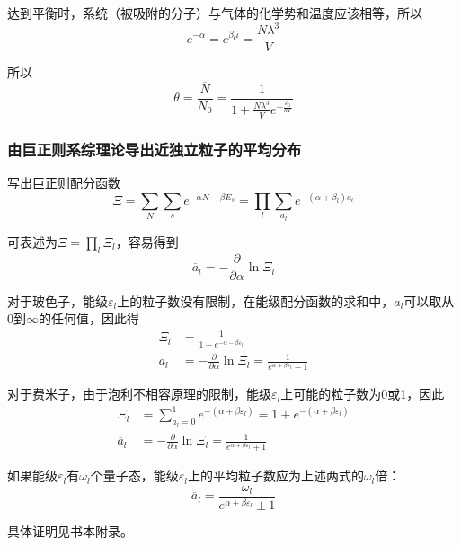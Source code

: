 \documentclass[UTF8]{ctexart}
\begin{document}
	达到平衡时，系统（被吸附的分子）与气体的化学势和温度应该相等，所以
	\begin{equation}
		e^{-\alpha}=e^{\beta \mu}=\frac{N \lambda^{3}}{V}
	\end{equation}
	
\noindent 所以
\begin{equation}
	\theta= \frac{\overline{N}}{N_{0}}=\frac{1}{1+\frac{N \lambda^{3}}{V} e^{-\frac{\varepsilon_{0}}{k T}}}
\end{equation}

	\subsubsection{由巨正则系综理论导出近独立粒子的平均分布}
	写出巨正则配分函数
	\begin{equation}
		\Xi =\sum_{N} \sum_{s} e^{-\alpha N-\beta E_{s}}=\prod_{l} \sum_{a_{l}} e^{-\left(\alpha+\beta_{l}\right) a_{l}}
	\end{equation}
	
\noindent 可表述为$ \Xi =\prod_{l} \Xi_{l} $，容易得到
	\begin{equation}
		\overline{a}_{l} = -\frac{\partial}{\partial \alpha} \ln \Xi_{l}
	\end{equation}
	
	对于玻色子，能级$ \varepsilon_{l} $上的粒子数没有限制，在能级配分函数的求和中，$ a_{l} $可以取从0到$ \infty $的任何值，因此得
	\begin{equation}
	\begin{aligned}
	\Xi_{l} &=\frac{1}{1-e^{-\alpha-\beta \varepsilon_{l}}}\\
	\overline{a}_{l}&=-\frac{\partial}{\partial \alpha} \ln \Xi_{l}=\frac{1}{e^{\alpha+\beta \varepsilon_{l}}-1}
	\end{aligned}
	\end{equation}
	
	对于费米子，由于泡利不相容原理的限制，能级$ \varepsilon_{l} $上可能的粒子数为0或1，因此
	\begin{equation}
		\begin{aligned}
		\Xi_{l} &=\sum_{a_{l}=0}^{1} e^{-\left(\alpha+\beta \varepsilon_{l}\right)}=1+e^{-\left(\alpha+\beta \varepsilon_{l}\right)}
		\\
		\overline{a}_{l}&=-\frac{\partial}{\partial \alpha} \ln \Xi_{l} =\frac{1}{e^{\alpha+\beta \varepsilon_{l}}+1}
		\end{aligned}
	\end{equation}
	
	如果能级$ \varepsilon_{l} $有$ \omega_{l} $个量子态，能级$ \varepsilon_{l} $上的平均粒子数应为上述两式的$ \omega_{l} $倍：
	\begin{equation}
		\overline{a}_{l} =\frac{\omega_{l}}{e^{\alpha+\beta \varepsilon_{l}} \pm 1}
	\end{equation}

\noindent 具体证明见书本附录。
\end{document}
